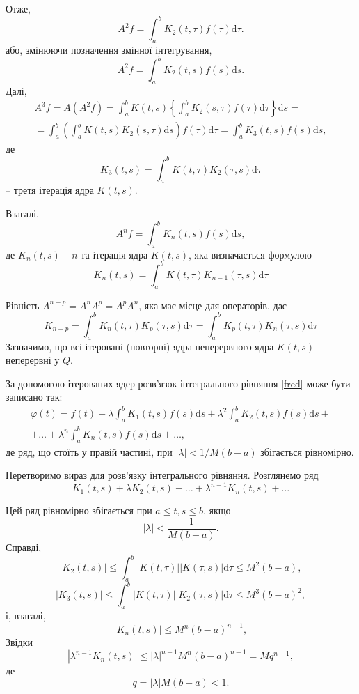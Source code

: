 \documentclass[14pt,twoside]{extreport}
\theoremstyle{mystyle}
\numberwithin{equation}{chapter}
\begin{document}
Отже,
\[
A^2 f = \int_{a}^{b} K_2(t,\tau) f(\tau)\mathrm{d}\tau.
\]
або, змінюючи позначення змінної інтегрування,
\[
A^2 f = \int_{a}^{b} K_2(t,s) f(s)\mathrm{d}s.
\]
Далі,
\begin{multline*}
A^3f=A(A^2f)=\int_{a}^{b} K(t,s) \left\{\int_{a}^{b} K_2(s,\tau) f(\tau)\mathrm{d}\tau\right\}\mathrm{d}s=\\
=\int_{a}^{b} \left(\int_{a}^{b} K(t, s) K_2(s, \tau)\mathrm{d}s\right)f(\tau)\mathrm{d}\tau = \int_{a}^{b} K_3(t,s) f(s)\mathrm{d}s,
\end{multline*}
де
\[
 K_3(t, s)=\int_{a}^{b} K(t, \tau) K_2(\tau, s)\mathrm{d}\tau
\]
-- третя ітерація ядра $K(t, s)$.

Взагалі,
\[
 A^nf=\int_{a}^{b} K_n(t,s) f(s)\mathrm{d}s,
\]
де $K_n(t, s)$ -- $n$-та ітерація ядра $K(t, s)$, яка визначається формулою
\begin{equation}
 K_n(t, s) = \int_{a}^{b} K(t, \tau) K_{n-1}(\tau, s)\mathrm{d}\tau
\end{equation}

Рівність $A^{n+p} = A^nA^p=A^pA^n$, яка має місце для операторів, дає
\begin{equation}\label{knpp}
 K_{n+p} = \int_{a}^{b} K_n(t, \tau) K_p(\tau, s)\mathrm{d}\tau=\int_{a}^{b} K_p(t, \tau) K_n(\tau, s)\mathrm{d}\tau
\end{equation}
Зазначимо, що всі ітеровані (повторні) ядра неперервного ядра $K(t, s)$ неперервні у $Q$.

За допомогою ітерованих ядер розв'язок інтегрального рівняння \eqref{fred} може бути записано так:
\begin{multline}\label{solser}
  \varphi(t) = f(t) + \lambda\int_{a}^{b} K_1(t,s) f(s)\mathrm{d}s + \lambda^2\int_{a}^{b} K_2(t,s) f(s)\mathrm{d}s+\\
 + \ldots + \lambda^n\int_{a}^{b} K_n(t,s) f(s)\mathrm{d}s + \ldots,
\end{multline}
де ряд, що стоїть у правій частині, при $|\lambda|<1/M(b-a)$ збігається рівномірно.

Перетворимо вираз для розв'язку інтегрального рівняння. Розглянемо ряд
\begin{equation}\label{kseries}
 K_1(t, s) + \lambda K_2(t, s) + \ldots + \lambda^{n-1} K_n(t, s) + \ldots
\end{equation}

Цей ряд рівномірно збігається при $a\leqslant t, s \leqslant b$, якщо
\[
 |\lambda| < \frac{1}{M(b-a)}.
\]
Справді,
\[
 |K_2(t, s)| \leqslant \int_{a}^{b} |K(t,\tau)| |K(\tau, s)| \mathrm{d}\tau \leqslant M^2 (b-a),
\]
\[
 |K_3(t, s)| \leqslant \int_{a}^{b} |K(t,\tau)| |K_2(\tau, s)| \mathrm{d}\tau \leqslant M^3 (b-a)^2,
\]
і, взагалі,
\[
 |K_n(t, s)| \leqslant M^n (b-a)^{n-1},
\]
Звідки
\[
 |\lambda^{n-1}K_n(t, s)| \leqslant |\lambda|^{n-1} M^n (b-a)^{n-1} = Mq^{n-1},
\]
де
\[
 q=|\lambda|M(b-a) <1.
\]
\end{document}
